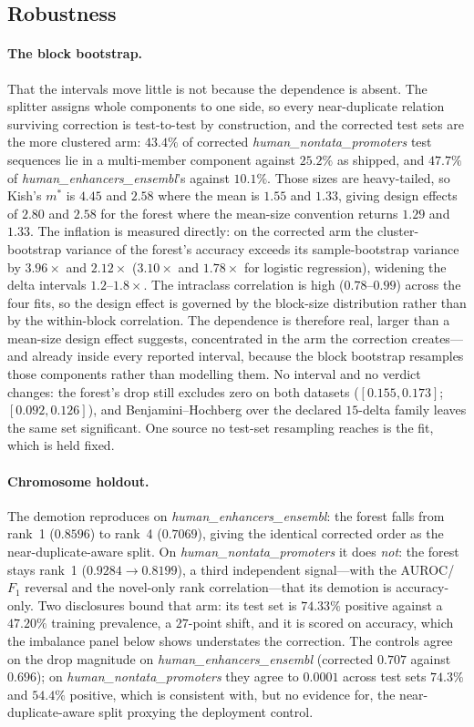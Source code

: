 \documentclass[webpdf,modern,large,namedate]{oup-authoring-template}%
\begin{document}
\subsection{Robustness}\label{sec:r-robust}
\paragraph{The block bootstrap.} That the intervals move little is not because the dependence is absent. The splitter assigns whole components to one side, so every near-duplicate relation surviving correction is test-to-test by construction, and the corrected test sets are the more clustered arm: $43.4\%$ of corrected \textit{human\_nontata\_promoters} test sequences lie in a multi-member component against $25.2\%$ as shipped, and $47.7\%$ of \textit{human\_enhancers\_ensembl}'s against $10.1\%$. Those sizes are heavy-tailed, so Kish's $m^{*}$ is $4.45$ and $2.58$ where the mean is $1.55$ and $1.33$, giving design effects of $2.80$ and $2.58$ for the forest where the mean-size convention returns $1.29$ and $1.33$. The inflation is measured directly: on the corrected arm the cluster-bootstrap variance of the forest's accuracy exceeds its sample-bootstrap variance by $3.96\times$ and $2.12\times$ ($3.10\times$ and $1.78\times$ for logistic regression), widening the delta intervals $1.2$--$1.8\times$. The intraclass correlation is high ($0.78$--$0.99$) across the four fits, so the design effect is governed by the block-size distribution rather than by the within-block correlation. The dependence is therefore real, larger than a mean-size design effect suggests, concentrated in the arm the correction creates---and already inside every reported interval, because the block bootstrap resamples those components rather than modelling them. No interval and no verdict changes: the forest's drop still excludes zero on both datasets ($[0.155,0.173]$; $[0.092,0.126]$), and Benjamini--Hochberg over the declared $15$-delta family leaves the same set significant. One source no test-set resampling reaches is the fit, which is held fixed.

\paragraph{Chromosome holdout.} The demotion reproduces on \textit{human\_enhancers\_ensembl}: the forest falls from rank~1 ($0.8596$) to rank~4 ($0.7069$), giving the identical corrected order as the near-duplicate-aware split. On \textit{human\_nontata\_promoters} it does \emph{not}: the forest stays rank~1 ($0.9284\to0.8199$), a third independent signal---with the AUROC/$F_1$ reversal and the novel-only rank correlation---that its demotion is accuracy-only. Two disclosures bound that arm: its test set is $74.33\%$ positive against a $47.20\%$ training prevalence, a $27$-point shift, and it is scored on accuracy, which the imbalance panel below shows understates the correction. The controls agree on the drop magnitude on \textit{human\_enhancers\_ensembl} (corrected $0.707$ against $0.696$); on \textit{human\_nontata\_promoters} they agree to $0.0001$ across test sets $74.3\%$ and $54.4\%$ positive, which is consistent with, but no evidence for, the near-duplicate-aware split proxying the deployment control.
\end{document}

